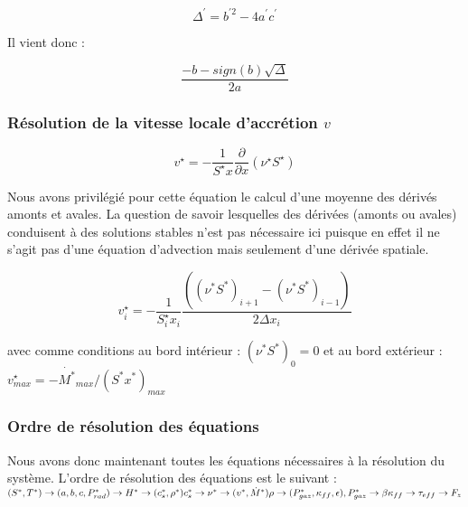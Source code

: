 \begin{equation}
	\Delta^{\prime} = b^{\prime 2} - 4a^{\prime}c^{\prime}
\end{equation} 

Il vient donc : 

\begin{equation}
	\frac{-b -sign(b) \sqrt{\Delta}}{2a}
\end{equation}

\subsubsection{Résolution de la vitesse locale d'accrétion $v$}
\begin{equation}
    v^\star = - \frac{1}{S^\star x} \frac{\partial}{\partial x} \left(\nu^\star S^\star\right)
\end{equation} 

Nous avons privilégié pour cette équation le calcul d'une moyenne des dérivés amonts et avales. La question de savoir lesquelles des dérivées (amonts ou avales) conduisent à des solutions stables n'est pas nécessaire ici puisque en effet il ne s'agit pas d'une équation d'advection mais seulement d'une dérivée spatiale.  


\begin{equation}
    v^\star_{i} = - \frac{1}{S_{i}^\star x_{i}} \frac{( (\nu^{*}S^{*})_{i+1} - (\nu^{*}S^{*})_{i-1} )}{2 \Delta x_{i}}
\end{equation} 

avec comme conditions au bord intérieur : $(\nu^{*}S^{*})_{0} = 0$ et au bord extérieur : $v^\star_{max}   = - \dot{M^{*}}_{max} / (S^{*}x^{*})_{max}$

\subsubsection{Ordre de résolution des équations}

Nous avons donc maintenant toutes les équations  nécessaires à la résolution du système. L'ordre de résolution des équations est le suivant :  \\


        \noindent $(S^{*},T^{*}) \rightarrow (a, b, c, P_{rad}^{*}) \rightarrow H^{*}
        \rightarrow (c_{s}^{*}, \rho^{*}) \\
        c_{s}^{*} \rightarrow \nu^{*} \rightarrow (v^{*}, \dot{M}^{*}) \\
        \rho \rightarrow (P_{gaz}^{*}, \kappa_{ff}, \epsilon) , \\
        P_{gaz}^{*} \rightarrow \beta \\
        \kappa_{ff} \rightarrow \tau_{eff} \rightarrow F_{z} $
        

